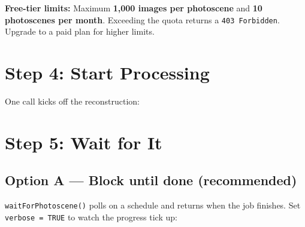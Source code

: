 \documentclass[
  11pt,
  letterpaper,
  DIV=11,
  numbers=noendperiod]{scrreprt}
\newenvironment{Shaded}{\begin{snugshade}}{\end{snugshade}}
\newcommand{\AttributeTok}[1]{\textcolor[rgb]{0.40,0.45,0.13}{#1}}
\newcommand{\CommentTok}[1]{\textcolor[rgb]{0.37,0.37,0.37}{#1}}
\newcommand{\FunctionTok}[1]{\textcolor[rgb]{0.28,0.35,0.67}{#1}}
\newcommand{\NormalTok}[1]{\textcolor[rgb]{0.00,0.23,0.31}{#1}}
\newcommand{\OtherTok}[1]{\textcolor[rgb]{0.00,0.23,0.31}{#1}}
\newcommand{\SpecialCharTok}[1]{\textcolor[rgb]{0.37,0.37,0.37}{#1}}
\begin{document}
\begin{tcolorbox}[enhanced jigsaw, titlerule=0mm, colback=white, colframe=quarto-callout-warning-color-frame, bottomtitle=1mm, bottomrule=.15mm, coltitle=black, arc=.35mm, left=2mm, title=\textcolor{quarto-callout-warning-color}{\faExclamationTriangle}\hspace{0.5em}{Warning}, colbacktitle=quarto-callout-warning-color!10!white, toptitle=1mm, breakable, toprule=.15mm, rightrule=.15mm, leftrule=.75mm, opacitybacktitle=0.6, opacityback=0]

\textbf{Free-tier limits:} Maximum \textbf{1,000 images per photoscene}
and \textbf{10 photoscenes per month}. Exceeding the quota returns a
\texttt{403\ Forbidden}. Upgrade to a paid plan for higher limits.

\end{tcolorbox}

\section{Step 4: Start Processing}\label{step-4-start-processing}

One call kicks off the reconstruction:

\begin{Shaded}
\end{Shaded}

\section{Step 5: Wait for It}\label{step-5-wait-for-it}

\subsection{Option A --- Block until done
(recommended)}\label{option-a-block-until-done-recommended}

\texttt{waitForPhotoscene()} polls on a schedule and returns when the
job finishes. Set \texttt{verbose\ =\ TRUE} to watch the progress tick
up:
\end{document}
